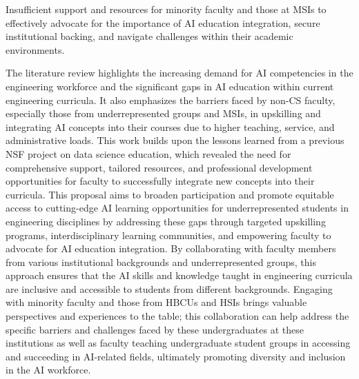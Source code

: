 \documentclass[11pt]{article}
\begin{document}
\begin{gitemize2}
\item Insufficient support and resources for minority faculty and those at MSIs to effectively advocate for the importance of AI education integration, secure institutional backing, and navigate challenges within their academic environments.
\end{gitemize2}

The literature review highlights the increasing demand for AI competencies in the engineering workforce and the significant gaps in AI education within current engineering curricula. It also emphasizes the barriers faced by non-CS faculty, especially those from underrepresented groups and MSIs, in upskilling and integrating AI concepts into their courses due to higher teaching, service, and administrative loads.
This work builds upon the lessons learned from a previous NSF project on data science education, which revealed the need for comprehensive support, tailored resources, and professional development opportunities for faculty to successfully integrate new concepts into their curricula.
This proposal aims to broaden participation and promote equitable access to cutting-edge AI learning opportunities for underrepresented students in engineering disciplines by addressing these gaps through targeted upskilling programs, interdisciplinary learning communities, and empowering faculty to advocate for AI education integration.
By collaborating with faculty members from various institutional backgrounds and underrepresented groups, this approach ensures that the AI skills and knowledge taught in engineering curricula are inclusive and accessible to students from different backgrounds.
Engaging with minority faculty and those from HBCUs and HSIs brings valuable perspectives and experiences to the table; this collaboration can help address the specific barriers and challenges faced by these undergraduates at these institutions as well as faculty teaching undergraduate student groups in accessing and succeeding in AI-related fields, ultimately promoting diversity and inclusion in the AI workforce.
\end{document}

